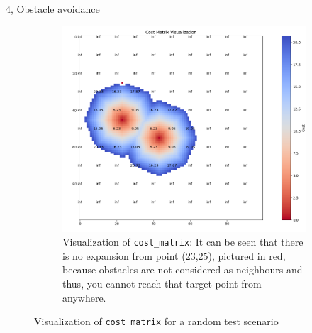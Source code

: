 \documentclass[10pt,a4paper]{article}
\begin{document}
\begin{task}{4, Obstacle avoidance}
\begin{figure}[H]
\begin{center}
\begin{subfigure}{0.65\textwidth}
 \centering
 \includegraphics[width=1\textwidth]{images/task4_dij_2d_expanding.png}
 \caption{Visualization of \texttt{cost\_matrix}: It can be seen that there is no expansion from point (23,25), pictured in red, because obstacles are not considered as neighbours and thus, you cannot reach that target point from anywhere.}
 \end{subfigure}

\end{center}


\caption{Visualization of \texttt{cost\_matrix} for a random test scenario}

\end{figure}
 
\begin{figure}[H] \ContinuedFloat

\begin{center}



\end{center}
\end{figure}
\end{task}
\end{document}
